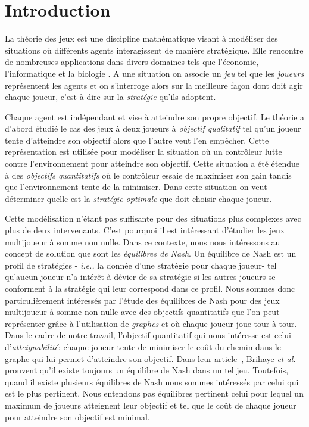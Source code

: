 
\section{Introduction}

La théorie des jeux est une discipline mathématique visant à modéliser des situations où différents agents interagissent de manière stratégique. Elle rencontre de nombreuses applications dans divers domaines tels que l'économie, l'informatique et la biologie .
A une situation on associe un \emph{jeu} tel que les \emph{joueurs} représentent les agents et on s'interroge alors sur la meilleure façon dont doit agir chaque joueur, c'est-à-dire sur la \emph{stratégie} qu'ils adoptent.

Chaque agent est indépendant et vise à atteindre son propre objectif. Le théorie a d'abord étudié le cas des jeux à deux joueurs à \emph{objectif qualitatif} tel qu'un joueur tente d'atteindre son objectif alors que l'autre veut l'en empêcher. Cette représentation est utilisée pour modéliser la situation où un contrôleur lutte contre l'environnement pour atteindre son objectif. Cette situation a été étendue à des \emph{objectifs quantitatifs} où le contrôleur essaie de maximiser son gain tandis que l'environnement tente de la minimiser. Dans cette situation on veut déterminer quelle est la \emph{stratégie optimale} que doit choisir chaque joueur.

Cette modélisation n'étant pas suffisante pour des situations plus complexes avec plus de deux intervenants. C'est pourquoi il est intéressant d'étudier les jeux multijoueur à somme non nulle. Dans ce contexte, nous nous intéressons au concept de solution que sont les \emph{équilibres de Nash}. Un équilibre de Nash est un profil de stratégies - \emph{i.e.,} la donnée d'une stratégie pour chaque joueur- tel qu'aucun joueur n'a intérêt à dévier de sa stratégie si les autres joueurs se conforment à la stratégie qui leur correspond dans ce profil.
Nous sommes donc particulièrement intéressés par l'étude des équilibres de Nash pour des jeux multijoueur à somme non nulle avec des objectifs quantitatifs que l'on peut représenter grâce à l'utilisation de \emph{graphes} et où chaque joueur joue tour à tour.\\


Dans le cadre de notre travail, l'objectif quantitatif qui nous intéresse est celui d'\emph{atteignabilité}: chaque joueur tente de minimiser le coût du chemin dans le graphe qui lui permet d'atteindre son objectif. Dans leur article~\cite{DBLP:conf/lfcs/BrihayePS13}, Brihaye \emph{et al.} prouvent qu'il existe toujours un équilibre de Nash dans un tel jeu. Toutefois, quand il existe plusieurs équilibres de Nash nous sommes intéressés par celui qui est le plus pertinent. Nous entendons pas équilibres pertinent  celui pour lequel un maximum de joueurs atteignent leur objectif et tel que le coût de chaque joueur pour atteindre son objectif est minimal.

